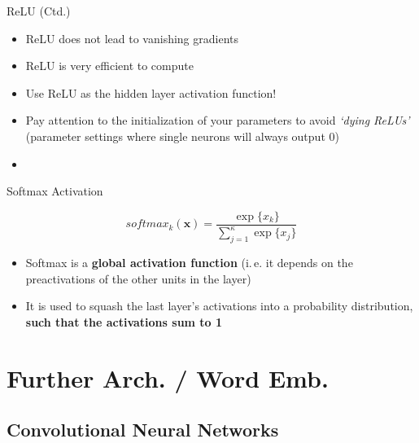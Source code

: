 \begin{frame}{ReLU (Ctd.)}{}\important
	\begin{itemize}
		\item ReLU does not lead to vanishing gradients
		\item ReLU is very efficient to compute
		\item Use ReLU as the hidden layer activation function!
		\item {} Pay attention to the initialization of your parameters to avoid \textit{`dying ReLUs'} (parameter settings where single neurons will always output 0)
		\item {}
	\end{itemize}
\end{frame}


\begin{frame}{Softmax Activation}{}
	\begin{boxBlueNoFrame}
		\begin{equation*}
			softmax_k(\bm{x}) = \frac{\exp\{ x_k\}}{\sum_{j=1}^{\kappa} \exp\{x_j\}}
		\end{equation*}
	\end{boxBlueNoFrame}
	\vspace*{1mm}
	
	\begin{itemize}
		\item Softmax is a \textbf{global activation function} (i.\,e. it depends on the preactivations of the other units in the layer)
		\item It is used to squash the last layer's activations into a probability distribution, \textbf{such that the activations sum to 1}
	\end{itemize}
\end{frame}


\section[Further Network Architectures and Word Embeddings]{Further Arch. / Word Emb.}

\subsection{Convolutional Neural Networks}

